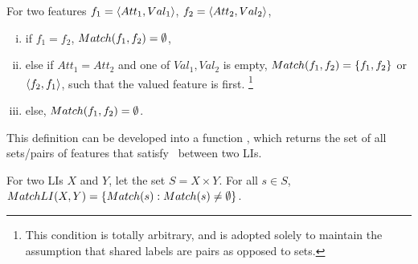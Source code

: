 \begin{definition}\label{def:match}
    For two features $f_1 = \langle Att_{1},Val_{1} \rangle$, $f_2 = \langle Att_{2},Val_{2} \rangle$,
    \begin{enumerate}[(i)]
        \item if $f_1 = f_2$, $Match(f_1,f_2) = \emptyset$,
        \item else if $Att_1 = Att_2$ and one of $Val_1, Val_2$ is empty, $Match(f_1,f_2) = \{f_1, f_2\}$ or $\langle f_2,f_1 \rangle$, such that the valued feature is first.%
            \footnote{This condition is totally arbitrary, and is adopted solely to maintain the assumption that shared labels are pairs as opposed to sets.}
        \item else, $Match(f_1,f_2) = \emptyset$.
    \end{enumerate}
\end{definition}
\noindent
This definition can be developed into a function \MatchLI, which returns the set of all sets/pairs of features that satisfy \Match\ between two LIs.

\begin{definition}\label{def:matchLI}
    For two LIs $X$ and $Y$, let the set $S = X \times Y$. For all $s \in S$, $MatchLI(X, Y) = \{Match(s) : Match(s) \neq \emptyset\}$.
\end{definition}
